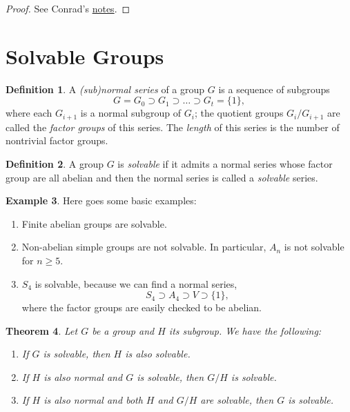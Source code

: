 \documentclass[12pt]{report}
\newtheorem{theorem}{Theorem}[section]
\theoremstyle{definition}
\newtheorem{definition}[theorem]{Definition}
\newtheorem{example}[theorem]{Example}
\begin{document}
\begin{proof}
	See Conrad's \hyperlink{https://kconrad.math.uconn.edu/blurbs/galoistheory/cubicquartic.pdf}{notes}.
\end{proof}

\section{Solvable Groups}

\begin{definition}
	A \emph{(sub)normal series} of a group $G$ is a sequence of subgroups
	\[G=G_0\supset G_1\supset \dots \supset G_t=\{1\},\]
	where each $G_{i+1}$ is a normal subgroup of $G_i$; the quotient groups $G_i/G_{i+1}$ are called the \emph{factor groups} of this series. The \emph{length} of this series is the number of nontrivial factor groups.
\end{definition}

\begin{definition}
	A group $G$ is \emph{solvable} if it admits a normal series whose factor group are all abelian and then the normal series is called a \emph{solvable} series.
\end{definition}

\begin{example} Here goes some basic examples:
	\begin{enumerate}
		\item Finite abelian groups are solvable.
		\item Non-abelian simple groups are not solvable. In particular, $A_n$ is not solvable for $n\geq 5$.
		\item $S_4$ is solvable, because we can find a normal series, \[S_4\supset A_4\supset V \supset \{1\},\] where the factor groups are easily checked to be abelian.
	\end{enumerate}
\end{example}


\begin{theorem}\label{solthm} Let $G$ be a group and $H$ its subgroup. We have the following:
	\begin{enumerate}
		\item If $G$ is solvable, then $H$ is also solvable.
		\item If $H$ is also normal and $G$ is solvable, then $G/H$ is solvable.
		\item If $H$ is also normal and both $H$ and $G/H$ are solvable, then $G$ is solvable.
	\end{enumerate}
\end{theorem}
\end{document}
